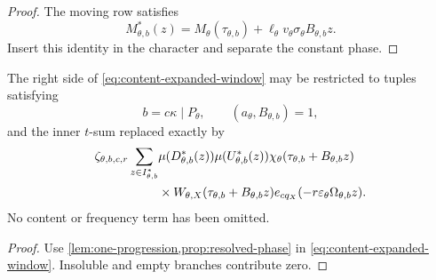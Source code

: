 \begin{proof}
The moving row satisfies
\[
 M_{\theta,b}^\ast(z)
 =
 M_\theta(\tau_{\theta,b})
 +
 \ell_\theta v_\theta\sigma_\theta
 B_{\theta,b}z.
\]
Insert this identity in the character and separate the constant
phase.
\end{proof}

\begin{corollary}
\label{cor:fully-resolved-window}
The right side of \eqref{eq:content-expanded-window} may be restricted
to tuples satisfying
\[
 b=c\kappa\mid P_\theta,\qquad
 (a_\theta,B_{\theta,b})=1,
\]
and the inner \(t\)-sum replaced exactly by
\begin{align}
 \zeta_{\theta,b,c,r}
 \sum_{z\in I_{\theta,b}^\ast}
 &\mu(D_{\theta,b}^\ast(z))
 \mu(U_{\theta,b}^\ast(z))
 \chi_\theta(\tau_{\theta,b}+B_{\theta,b}z)
\notag\\
 &\times
 W_{\theta,X}(\tau_{\theta,b}+B_{\theta,b}z)
 e_{cq_X}(-r\varepsilon_\theta\Omega_{\theta,b}z).
\label{eq:fully-resolved-inner-sum}
\end{align}
No content or frequency term has been omitted.
\end{corollary}

\begin{proof}
Use \cref{lem:one-progression,prop:resolved-phase} in
\eqref{eq:content-expanded-window}.  Insoluble and empty branches
contribute zero.
\end{proof}
